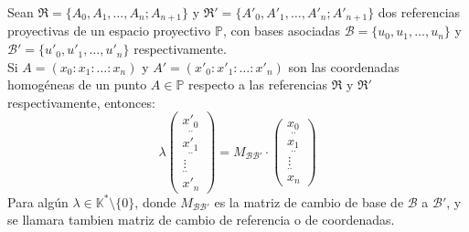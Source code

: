 \begin{definición}
    Sean $\mathfrak{R} = \{A_0, A_1, \ldots, A_n; A_{n+1}\}$ y $\mathfrak{R}' = \{A'_0, A'_1, \ldots, A'_n; A'_{n+1}\}$ dos referencias proyectivas de un espacio proyectivo $\mathbb{P}$, con bases asociadas $\mathcal{B} = \{u_0, u_1, \ldots, u_n\}$ y $\mathcal{B}' = \{u'_0, u'_1, \ldots, u'_n\}$ respectivamente.\\
    Si $A=\left(x_0 : x_1 : \ldots : x_n\right)$ y $A'=\left(x'_0 : x'_1 : \ldots : x'_n\right)$ son las coordenadas homogéneas de un punto $A \in \mathbb{P}$ respecto a las referencias $\mathfrak{R}$ y $\mathfrak{R}'$ respectivamente, entonces:
    \[
    \lambda
        \begin{pmatrix}
            \underset{..}{x'_0} \\
            \underset{..}{x'_1} \\
            \underset{..}{\vdots} \\
            x'_n
        \end{pmatrix} = M_{\mathcal{B}\mathcal{B}'} \cdot 
        \begin{pmatrix}
            \underset{..}{x_0} \\
            \underset{..}{x_1} \\
            \underset{..}{\vdots} \\
            x_n
        \end{pmatrix}
    \]
    Para algún $\lambda \in \mathbb{K}^* \setminus \{0\}$, donde $M_{\mathcal{B}\mathcal{B}'}$ es la matriz de cambio de base de $\mathcal{B}$ a $\mathcal{B}'$, y se llamara tambien matriz de cambio de referencia o de coordenadas.
\end{definición}